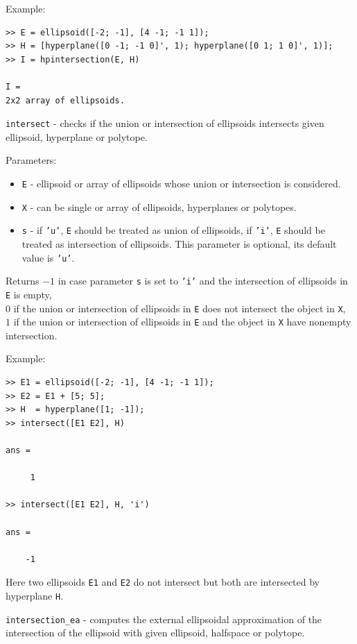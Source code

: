\documentclass{report}
\begin{document}
Example:
{\tt \begin{verbatim}
>> E = ellipsoid([-2; -1], [4 -1; -1 1]);
>> H = [hyperplane([0 -1; -1 0]', 1); hyperplane([0 1; 1 0]', 1)];
>> I = hpintersection(E, H)

I =
2x2 array of ellipsoids.
\end{verbatim} }

\newpage

{\Large {\tt intersect}} - checks if the union or intersection of ellipsoids
intersects given ellipsoid, hyperplane or polytope.

Parameters:
\begin{itemize}
\item {\tt E} - ellipsoid or array of ellipsoids whose union or intersection
is considered.
\item {\tt X} - can be single or array of ellipsoids, hyperplanes or polytopes.
\item {\tt s} - if {\tt 'u'}, {\tt E} should be treated as union of ellipsoids,
if {\tt 'i'}, {\tt E} should be treated as intersection of ellipsoids.
This parameter is optional, its default value is {\tt 'u'}.
\end{itemize}

Returns $-1$ in case parameter {\tt s} is set to {\tt 'i'} and the
intersection of ellipsoids in {\tt E} is empty,\\
$0$ if the union or intersection of ellipsoids in {\tt E} does not intersect
the object in {\tt X},\\
$1$ if the union or intersection of ellipsoids in {\tt E} and the object
in {\tt X} have nonempty intersection.

Example:
{\tt \begin{verbatim}
>> E1 = ellipsoid([-2; -1], [4 -1; -1 1]);
>> E2 = E1 + [5; 5];
>> H  = hyperplane([1; -1]);
>> intersect([E1 E2], H)

ans =

     1

>> intersect([E1 E2], H, 'i')

ans =

    -1
\end{verbatim} }
Here two ellipsoids {\tt E1} and {\tt E2} do not intersect but both are
intersected by hyperplane {\tt H}.

\newpage

{\Large {\tt intersection\_ea}} - computes the external ellipsoidal
approximation of the intersection of the ellipsoid with given ellipsoid,
halfspace or polytope.
\end{document}
